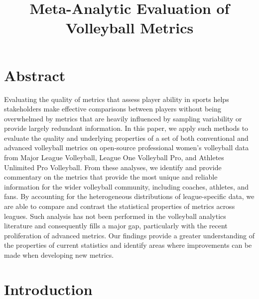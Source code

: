 \documentclass[10pt]{article}
\title{Meta-Analytic Evaluation of Volleyball Metrics}
\begin{document}
\maketitle


\section{Abstract}

Evaluating the quality of metrics that assess player ability in sports helps stakeholders make effective comparisons between players without being overwhelmed by metrics that are heavily influenced by sampling variability or provide largely redundant information.
In this paper, we apply such methods to evaluate the quality and underlying properties of a set of both conventional 
and advanced volleyball metrics 
on open-source professional women's volleyball data 
from Major League Volleyball, League One Volleyball Pro, and Athletes Unlimited Pro Volleyball.
From these analyses, we identify and provide commentary on the metrics that provide the most unique and reliable information for the wider volleyball community, including coaches, athletes, and fans.
By accounting for the heterogeneous distributions of league-specific data, we are able to compare and contrast the statistical properties of metrics across leagues.
Such analysis has not been performed in the volleyball analytics literature and consequently fills a major gap, particularly with the recent proliferation of advanced metrics.
Our findings provide a greater understanding of the properties of current statistics and identify areas where improvements can be made when developing new metrics.


\section{Introduction}
\end{document}
